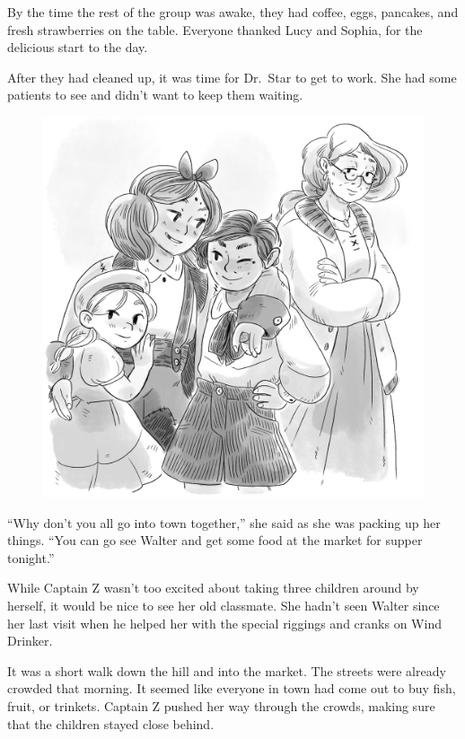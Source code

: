 \documentclass[12pt]{extbook}
\begin{document}
  By the time the rest of the group was awake, they had coffee, eggs,
  pancakes, and fresh strawberries on the table. Everyone thanked Lucy and
  Sophia, for the delicious start to the day.
  
  After they had cleaned up, it was time for Dr.~Star to get to work. She
  had some patients to see and didn't want to keep them waiting.
  
  \begin{figure}[htbp]
  \centering
  \includegraphics{img/dr_star_n_kids.png}
  \caption{}
  \end{figure}
  
  \enquote{Why don't you all go into town together,} she said as she was
  packing up her things. \enquote{You can go see Walter and get some food
  at the market for supper tonight.}
  
  While Captain Z wasn't too excited about taking three children around by
  herself, it would be nice to see her old classmate. She hadn't seen
  Walter since her last visit when he helped her with the special riggings
  and cranks on Wind Drinker.
  
  It was a short walk down the hill and into the market. The streets were
  already crowded that morning. It seemed like everyone in town had come
  out to buy fish, fruit, or trinkets. Captain Z pushed her way through
  the crowds, making sure that the children stayed close behind.
  
\end{document}
